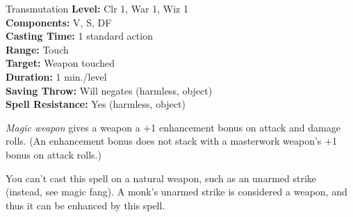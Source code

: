 {Transmutation}
{
	\textbf{Level:}
	Clr 1, War 1, Wiz 1\\
	\textbf{Components:}
	V, S, DF\\
	\textbf{Casting Time:}
	1 standard action\\
	\textbf{Range:}
	Touch\\
	\textbf{Target:}
	Weapon touched\\
	\textbf{Duration:}
	1 min./level\\
	\textbf{Saving Throw:}
	Will negates (harmless, object)\\
	\textbf{Spell Resistance:}
	Yes (harmless, object)\\
}
{
	\emph{Magic weapon} gives a weapon a +1 enhancement bonus on attack and damage rolls. (An enhancement bonus does not stack with a masterwork weapon's +1 bonus on attack rolls.)

	You can't cast this spell on a natural weapon, such as an unarmed strike (instead, see magic fang). A monk's unarmed strike is considered a weapon, and thus it can be enhanced by this spell.

}
